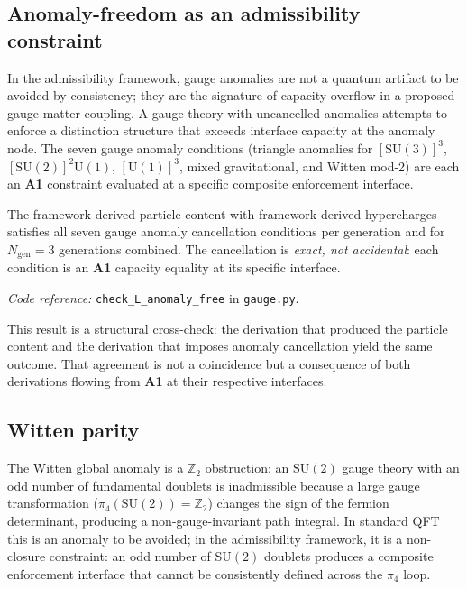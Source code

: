\documentclass[11pt]{article}
\newcommand{\coderef}[2]{\smallskip\noindent\textit{Code reference:} \texttt{#1} in \texttt{#2}.}
\newcommand{\SU}{\mathrm{SU}}
\newcommand{\Un}{\mathrm{U}}
\newcommand{\epitag}[1]{\textbf{[#1]}}
\newcommand{\Aone}{\textbf{A1}}
\theoremstyle{definition}
\begin{document}
\subsection{Anomaly-freedom as an admissibility constraint}\label{sec:anomaly_free}

In the admissibility framework, gauge anomalies are not a quantum artifact to be avoided by consistency; they are the signature of capacity overflow in a proposed gauge-matter coupling. A gauge theory with uncancelled anomalies attempts to enforce a distinction structure that exceeds interface capacity at the anomaly node. The seven gauge anomaly conditions (triangle anomalies for $[\SU(3)]^3$, $[\SU(2)]^2 \Un(1)$, $[\Un(1)]^3$, mixed gravitational, and Witten mod-2) are each an \Aone{} constraint evaluated at a specific composite enforcement interface.

\begin{tcolorbox}[apfbox, title={$L_{\mathrm{anomaly\_free}}$ \epitag{P}}]
The framework-derived particle content with framework-derived hypercharges satisfies all seven gauge anomaly cancellation conditions per generation and for $N_{\mathrm{gen}} = 3$ generations combined. The cancellation is \emph{exact, not accidental}: each condition is an \Aone{} capacity equality at its specific interface.
\end{tcolorbox}

\coderef{check\_L\_anomaly\_free}{gauge.py}

This result is a structural cross-check: the derivation that produced the particle content and the derivation that imposes anomaly cancellation yield the same outcome. That agreement is not a coincidence but a consequence of both derivations flowing from \Aone{} at their respective interfaces.

\subsection{Witten parity}\label{sec:witten_parity}

The Witten global anomaly is a $\mathbb{Z}_2$ obstruction: an $\SU(2)$ gauge theory with an odd number of fundamental doublets is inadmissible because a large gauge transformation ($\pi_4(\SU(2)) = \mathbb{Z}_2$) changes the sign of the fermion determinant, producing a non-gauge-invariant path integral. In standard QFT this is an anomaly to be avoided; in the admissibility framework, it is a non-closure constraint: an odd number of $\SU(2)$ doublets produces a composite enforcement interface that cannot be consistently defined across the $\pi_4$ loop.
\end{document}
